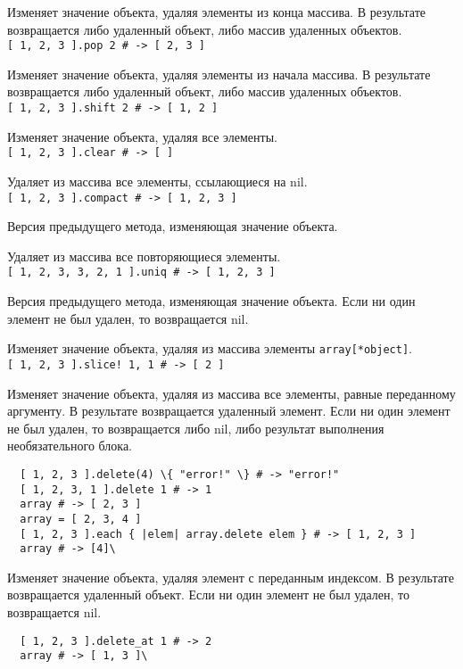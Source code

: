 \begin{methodlist}
  Изменяет значение объекта, удаляя элементы из конца массива. В результате возвращается либо удаленный объект, либо массив удаленных объектов. 
  \\\verb![ 1, 2, 3 ].pop 2 # -> [ 2, 3 ]!

  Изменяет значение объекта, удаляя элементы из начала массива. В результате возвращается либо удаленный объект, либо массив удаленных объектов. 
  \\\verb![ 1, 2, 3 ].shift 2 # -> [ 1, 2 ]!

  Изменяет значение объекта, удаляя все элементы.
  \\\verb![ 1, 2, 3 ].clear # -> [ ]!

  Удаляет из массива все элементы, ссылающиеся на nil. 
  \\\verb![ 1, 2, 3 ].compact # -> [ 1, 2, 3 ]!

  Версия предыдущего метода, изменяющая значение объекта. 

  Удаляет из массива все повторяющиеся элементы. 
  \\\verb![ 1, 2, 3, 3, 2, 1 ].uniq # -> [ 1, 2, 3 ]!

  Версия предыдущего метода, изменяющая значение объекта. Если ни один элемент не был удален, то возвращается nil. 

  Изменяет значение объекта, удаляя из массива элементы \verb!array[*object]!.
  \\\verb|[ 1, 2, 3 ].slice! 1, 1 # -> [ 2 ]|

  Изменяет значение объекта, удаляя из массива все элементы, равные переданному аргументу. В результате возвращается удаленный элемент. 
  Если ни один элемент не был удален, то возвращается либо nil, либо результат выполнения необязательного блока.
  \begin{verbatim}
  [ 1, 2, 3 ].delete(4) \{ "error!" \} # -> "error!"
  [ 1, 2, 3, 1 ].delete 1 # -> 1
  array # -> [ 2, 3 ]
  array = [ 2, 3, 4 ]
  [ 1, 2, 3 ].each { |elem| array.delete elem } # -> [ 1, 2, 3 ]
  array # -> [4]\
  \end{verbatim}

  Изменяет значение объекта, удаляя элемент с переданным индексом. В результате возвращается удаленный объект. Если ни один элемент не был удален, то возвращается nil. 
  \begin{verbatim}
  [ 1, 2, 3 ].delete_at 1 # -> 2 
  array # -> [ 1, 3 ]\
  \end{verbatim}


\end{methodlist}
